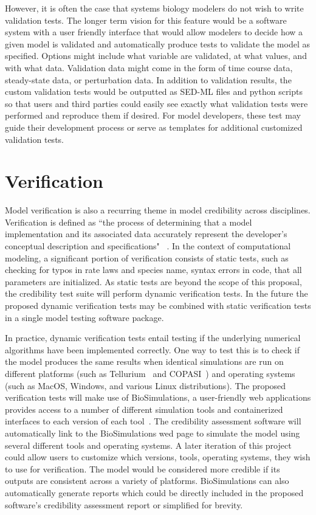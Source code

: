 \documentclass[12pt]{report}
\begin{document}
However, it is often the case that systems biology modelers do not wish to write validation tests. The longer term vision for this feature would be a software system with a user friendly interface that would allow modelers to decide how a given model is validated and automatically produce tests to validate the model as specified. Options might include what variable are validated, at what values, and with what data. Validation data might come in the form of time course data, steady-state data, or perturbation data. In addition to validation results, the custom validation tests would be outputted as SED-ML files and python scripts so that users and third parties could easily see exactly what validation tests were performed and reproduce them if desired. For model developers, these test may guide their development process or serve as templates for additional customized validation tests. 




\section{Verification}

Model verification is also a recurring theme in model credibility across disciplines. Verification is defined as ``the process of determining that a model implementation and its associated data accurately represent the developer's conceptual description and specifications" ~\cite{Thacker2004}. In the context of computational modeling, a significant portion of verification consists of static tests, such as checking for typos in rate laws and species name, syntax errors in code, that all parameters are initialized. As static tests are beyond the scope of this proposal, the credibility test suite will perform dynamic verification tests. In the future the proposed dynamic verification tests may be combined with static verification tests in a single model testing software package.

In practice, dynamic verification tests entail testing if the underlying numerical algorithms have been implemented correctly. One way to test this is to check if the model produces the same results when identical simulations are run on different platforms (such as Tellurium~\cite{Choi2018} and COPASI~\cite{Hoops2006}) and operating systems (such as MacOS, Windows, and various Linux distributions). The proposed verification tests will make use of BioSimulations, a user-friendly web applications provides access to a number of different simulation tools and containerized interfaces to each version of each tool~\cite{Shaikh2022}. The credibility assessment software will automatically link to the BioSimulations wed page to simulate the model using several different tools and operating systems. A later iteration of this project could allow users to customize which versions, tools, operating systems, they wish to use for verification. The model would be considered more credible if its outputs are consistent across a variety of platforms.  BioSimulations can also automatically generate reports which could be directly included in the proposed software's credibility assessment report or simplified for brevity. 
\end{document}
